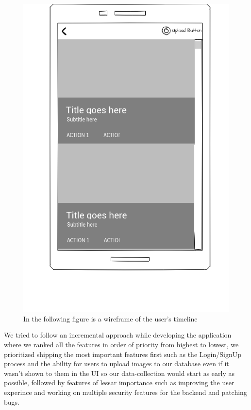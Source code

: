 \begin{figure}[H]
    \centering
    \includegraphics[scale=0.25]{Timeline}
    \caption{In the following figure is a wireframe of the user's timeline }
    \label{fig:Timeline}
\end{figure}
We tried to follow an incremental approach while developing the application where we ranked all the features in order of priority from highest to lowest, we prioritized shipping the most important features first such as the Login/SignUp process and the ability for users to upload images to our database even if it wasn't shown to them in the UI so our data-collection would start as early as possible, followed by features of lessar importance such as improving the user experince and working on multiple security features for the backend and patching bugs.
